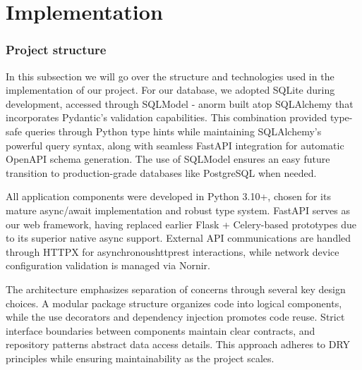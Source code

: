 
\chapter{Implementation}


\label{Chapter5Implementation}


    \subsection{Project structure}

    In this subsection we will go over the structure and technologies used in the implementation of our project. 
    For our database, we adopted SQLite during development, accessed through SQLModel - an\ac{orm} built atop SQLAlchemy 
    that incorporates Pydantic's validation capabilities. This combination provided type-safe queries through Python type 
    hints while maintaining SQLAlchemy's powerful query syntax, along with seamless FastAPI integration for automatic 
    OpenAPI schema generation. The use of SQLModel ensures an easy future transition to production-grade databases 
    like PostgreSQL when needed.

    All application components were developed in Python 3.10+, chosen for its mature async/await implementation and 
    robust type system. FastAPI serves as our web framework, having replaced earlier Flask + Celery-based prototypes 
    due to its superior native async support. External API communications are handled through HTTPX for 
    asynchronous\ac{http}\ac{rest} interactions, while network device configuration validation is managed via Nornir.
    
    The architecture emphasizes separation of concerns through several key design choices. A modular package structure 
    organizes code into logical components, while the use decorators and dependency injection promotes code reuse. 
    Strict interface boundaries between components maintain clear contracts, and repository patterns abstract data 
    access details. This approach adheres to DRY principles while ensuring maintainability as the project scales.

